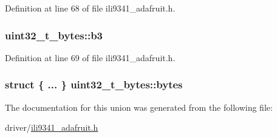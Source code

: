 Definition at line 68 of file ili9341\+\_\+adafruit.\+h.

\subsubsection[{\texorpdfstring{b3}{b3}}]{ uint32\+\_\+t\+\_\+bytes\+::b3}\hypertarget{unionuint32__t__bytes_abd7739cae59fab7cf712d53f337b378a}{}\label{unionuint32__t__bytes_abd7739cae59fab7cf712d53f337b378a}


Definition at line 69 of file ili9341\+\_\+adafruit.\+h.

\subsubsection[{\texorpdfstring{bytes}{bytes}}]{\setlength{\rightskip}{0pt plus 5cm}struct \{ ... \}   uint32\+\_\+t\+\_\+bytes\+::bytes}\hypertarget{unionuint32__t__bytes_a50aeebe398ee3b740421f1cc8d8583b8}{}\label{unionuint32__t__bytes_a50aeebe398ee3b740421f1cc8d8583b8}


The documentation for this union was generated from the following file\+:\begin{DoxyCompactItemize}
\item 
driver/\hyperlink{ili9341__adafruit_8h}{ili9341\+\_\+adafruit.\+h}\end{DoxyCompactItemize}
